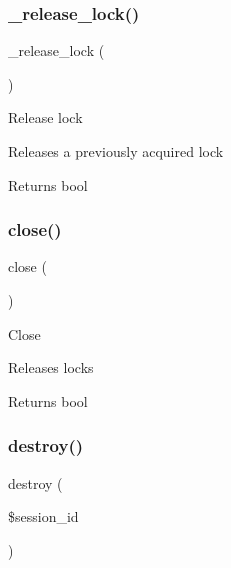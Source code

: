 \subsubsection{\texorpdfstring{\+\_\+release\+\_\+lock()}{\_release\_lock()}}
{\footnotesize\ttfamily \+\_\+release\+\_\+lock (\begin{DoxyParamCaption}{ }\end{DoxyParamCaption})\hspace{0.3cm}{\ttfamily [protected]}}

Release lock

Releases a previously acquired lock

\begin{DoxyReturn}{Returns}
bool 
\end{DoxyReturn}
\mbox{\label{class_c_i___session__database__driver_aa69c8bf1f1dcf4e72552efff1fe3e87e}} 
\subsubsection{\texorpdfstring{close()}{close()}}
{\footnotesize\ttfamily close (\begin{DoxyParamCaption}{ }\end{DoxyParamCaption})}

Close

Releases locks

\begin{DoxyReturn}{Returns}
bool 
\end{DoxyReturn}
\mbox{\label{class_c_i___session__database__driver_aaec5812f6b4eb6835f88d3baa06a002a}} 
\subsubsection{\texorpdfstring{destroy()}{destroy()}}
{\footnotesize\ttfamily destroy (\begin{DoxyParamCaption}\item[{}]{\$session\+\_\+id }\end{DoxyParamCaption})}


